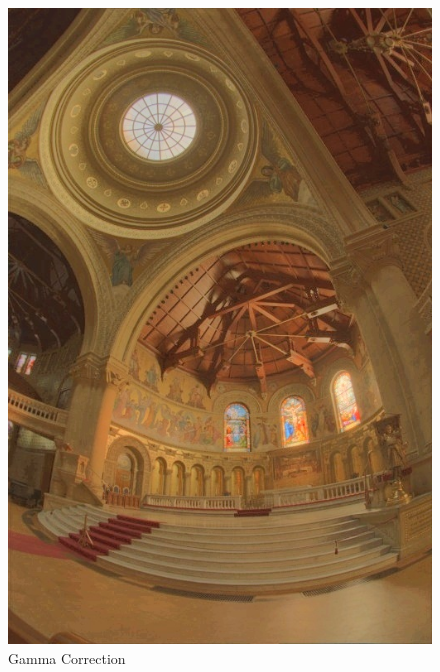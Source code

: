 \documentclass{article}
\begin{document}
\begin{figure}[!htb]
      \includegraphics[scale=.27]{./data/2/lg/s2.jpg}
      \caption{Gamma Correction}
    \endminipage\hfill

\end{figure}
\end{document}
